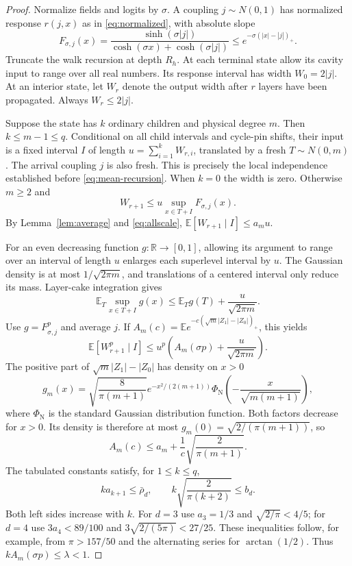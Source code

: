 \documentclass[11pt]{article}
\theoremstyle{definition}
\theoremstyle{remark}
\newcommand{\E}{\mathbb E}
\newcommand{\R}{\mathbb R}
\begin{document}
\begin{proof}
Normalize fields and logits by $\sigma$. A coupling $j\sim N(0,1)$ has
normalized response $r(j,x)$ as in \eqref{eq:normalized}, with absolute slope
\[
 F_{\sigma,j}(x)=\frac{\sinh(\sigma|j|)}
                       {\cosh(\sigma x)+\cosh(\sigma|j|)}
 \le e^{-\sigma(|x|-|j|)_+}.
\]
Truncate the walk recursion at depth $R_h$. At each terminal state allow
its cavity input to range over all real numbers. Its response interval
has width $W_0=2|j|$. At an interior state, let $W_r$ denote the output
width after $r$ layers have been propagated. Always $W_r\le2|j|$.

Suppose the state has $k$ ordinary children and physical degree $m$.
Then $k\le m-1\le q$. Conditional on all child intervals and cycle-pin
shifts, their input is a fixed interval $I$ of length
$u=\sum_{i=1}^k W_{r,i}$, translated by a fresh $T\sim N(0,m)$.
The arrival coupling $j$ is also fresh. This is precisely the local
independence established before \eqref{eq:mean-recursion}. When $k=0$
the width is zero. Otherwise $m\ge2$ and
\[
 W_{r+1}\le u\sup_{x\in T+I}F_{\sigma,j}(x).
\]
By Lemma~\ref{lem:average} and \eqref{eq:allscale},
$\E[W_{r+1}\mid I]\le a_m u$.

For an even decreasing function $g:\R\to[0,1]$, allowing its argument to
range over an interval of length $u$ enlarges each superlevel interval by
$u$. The Gaussian density is at most $1/\sqrt{2\pi m}$, and translations
of a centered interval only reduce its mass. Layer-cake integration gives
\[
 \E_T\sup_{x\in T+I}g(x)\le\E_Tg(T)+\frac{u}{\sqrt{2\pi m}}.
\]
Use $g=F_{\sigma,j}^p$ and average $j$. If
$A_m(c)=\E e^{-c(\sqrt m|Z_1|-|Z_0|)_+}$, this yields
\begin{equation}
 \E[W_{r+1}^p\mid I]\le
 u^p\left(A_m(\sigma p)+\frac{u}{\sqrt{2\pi m}}\right).
 \label{eq:frac-step}
\end{equation}
The positive part of $\sqrt m|Z_1|-|Z_0|$ has density on $x>0$
\[
 g_m(x)=\sqrt{\frac8{\pi(m+1)}}e^{-x^2/(2(m+1))}
       \Phi_{\mathrm N}\left(-\frac{x}{\sqrt{m(m+1)}}\right),
\]
where $\Phi_{\mathrm N}$ is the standard Gaussian distribution function.
Both factors decrease for $x>0$. Its density is therefore at most
$g_m(0)=\sqrt{2/(\pi(m+1))}$, so
\[
 A_m(c)\le a_m+\frac1c\sqrt{\frac2{\pi(m+1)}}.
\]
The tabulated constants satisfy, for $1\le k\le q$,
\[
 k a_{k+1}\le\bar\rho_d,\qquad
 k\sqrt{\frac2{\pi(k+2)}}\le b_d.
\]
Both left sides increase with $k$. For $d=3$ use $a_3=1/3$ and
$\sqrt{2/\pi}<4/5$; for $d=4$ use
$3a_4<89/100$ and $3\sqrt{2/(5\pi)}<27/25$.
These inequalities follow, for example, from $\pi>157/50$ and the
alternating series for $\arctan(1/2)$.
Thus $k A_m(\sigma p)\le\lambda<1$.


\end{proof}
\end{document}
